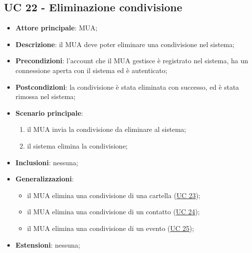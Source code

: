 \subsection{UC 22 - Eliminazione condivisione} \label{sec:UC22}
    \begin{itemize}
        \item \textbf{Attore principale}: MUA;
        \item \textbf{Descrizione}: il MUA deve poter eliminare una condivisione nel sistema;
        \item \textbf{Precondizioni}: l’account che il MUA gestisce è registrato nel sistema, ha un connessione aperta con il sistema ed è autenticato;
        \item \textbf{Postcondizioni}: la condivisione è stata eliminata con successo, ed è stata rimossa nel sistema;
        \item \textbf{Scenario principale}:
            \begin{enumerate}
                \item il MUA invia la condivisione da eliminare al sistema;
                \item il sistema elimina la condivisione;
            \end{enumerate}
        \item \textbf{Inclusioni}: nessuna;
        \item \textbf{Generalizzazioni}:
            \begin{itemize}
                \item il MUA elimina una condivisione di una cartella (\hyperref[sec:UC23]{UC 23});
                \item il MUA elimina una condivisione di un contatto (\hyperref[sec:UC24]{UC 24});
                \item il MUA elimina una condivisione di un evento (\hyperref[sec:UC25]{UC 25});
            \end{itemize}
        \item \textbf{Estensioni}: nessuna;
    \end{itemize}
